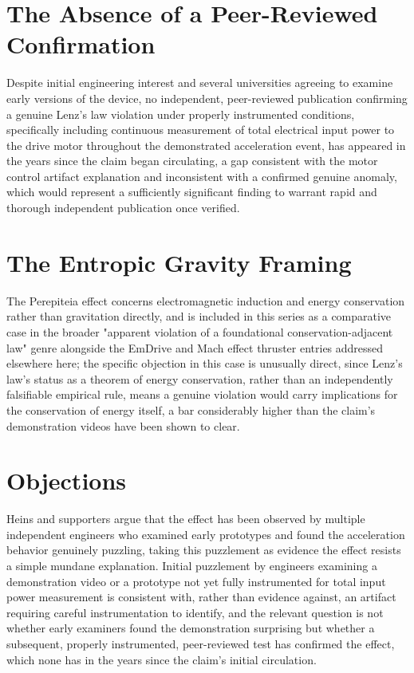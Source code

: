 \documentclass[11pt]{article}
\begin{document}
\section{The Absence of a Peer-Reviewed Confirmation}

Despite initial engineering interest and several universities agreeing to examine early versions of the device, no independent, peer-reviewed publication confirming a genuine Lenz's law violation under properly instrumented conditions, specifically including continuous measurement of total electrical input power to the drive motor throughout the demonstrated acceleration event, has appeared in the years since the claim began circulating, a gap consistent with the motor control artifact explanation and inconsistent with a confirmed genuine anomaly, which would represent a sufficiently significant finding to warrant rapid and thorough independent publication once verified.

\section{The Entropic Gravity Framing}

The Perepiteia effect concerns electromagnetic induction and energy conservation rather than gravitation directly, and is included in this series as a comparative case in the broader "apparent violation of a foundational conservation-adjacent law" genre alongside the EmDrive and Mach effect thruster entries addressed elsewhere here; the specific objection in this case is unusually direct, since Lenz's law's status as a theorem of energy conservation, rather than an independently falsifiable empirical rule, means a genuine violation would carry implications for the conservation of energy itself, a bar considerably higher than the claim's demonstration videos have been shown to clear.

\section{Objections}

Heins and supporters argue that the effect has been observed by multiple independent engineers who examined early prototypes and found the acceleration behavior genuinely puzzling, taking this puzzlement as evidence the effect resists a simple mundane explanation. Initial puzzlement by engineers examining a demonstration video or a prototype not yet fully instrumented for total input power measurement is consistent with, rather than evidence against, an artifact requiring careful instrumentation to identify, and the relevant question is not whether early examiners found the demonstration surprising but whether a subsequent, properly instrumented, peer-reviewed test has confirmed the effect, which none has in the years since the claim's initial circulation.
\end{document}
